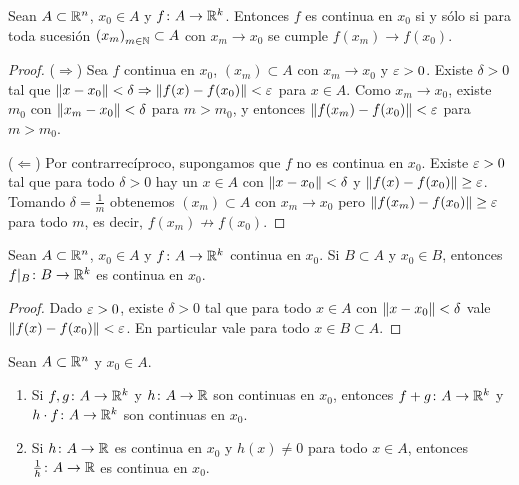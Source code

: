 \begin{prop}
  Sean \(A \subset \mathbb{R}^n\), \(x_0 \in A\) y \(f\colon A \to \mathbb{R}^k\). Entonces \(f\) es continua en \(x_0\) si y sólo si para toda sucesión \({(x_m)}_{m \in \mathbb{N}} \subset A\) con \(x_m \to x_0\) se cumple \(f(x_m) \to f(x_0)\).
\end{prop}

\begin{proof}
  (\(\Rightarrow\)) Sea \(f\) continua en \(x_0\), \({(x_m)} \subset A\) con \(x_m \to x_0\) y \(\varepsilon > 0\). Existe \(\delta > 0\) tal que \(\left\lVert x - x_0 \right\rVert < \delta \Rightarrow \left\lVert f(x) - f(x_0) \right\rVert < \varepsilon\) para \(x \in A\). Como \(x_m \to x_0\), existe \(m_0\) con \(\left\lVert x_m - x_0 \right\rVert < \delta\) para \(m > m_0\), y entonces \(\left\lVert f(x_m) - f(x_0) \right\rVert < \varepsilon\) para \(m > m_0\).

  (\(\Leftarrow\)) Por contrarrecíproco, supongamos que \(f\) no es continua en \(x_0\). Existe \(\varepsilon > 0\) tal que para todo \(\delta > 0\) hay un \(x \in A\) con \(\left\lVert x - x_0 \right\rVert < \delta\) y \(\left\lVert f(x) - f(x_0) \right\rVert \geq \varepsilon\). Tomando \(\delta = \frac{1}{m}\) obtenemos \({(x_m)} \subset A\) con \(x_m \to x_0\) pero \(\left\lVert f(x_m) - f(x_0) \right\rVert \geq \varepsilon\) para todo \(m\), es decir, \(f(x_m) \not\to f(x_0)\).
\end{proof}

\begin{prop}
  Sean \(A \subset \mathbb{R}^n\), \(x_0 \in A\) y \(f\colon A \to \mathbb{R}^k\) continua en \(x_0\). Si \(B \subset A\) y \(x_0 \in B\), entonces \(f|_B\colon B \to \mathbb{R}^k\) es continua en \(x_0\).
\end{prop}

\begin{proof}
  Dado \(\varepsilon > 0\), existe \(\delta > 0\) tal que para todo \(x \in A\) con \(\left\lVert x - x_0 \right\rVert < \delta\) vale \(\left\lVert f(x) - f(x_0) \right\rVert < \varepsilon\). En particular vale para todo \(x \in B \subset A\).
\end{proof}

\begin{prop}
  Sean \(A \subset \mathbb{R}^n\) y \(x_0 \in A\).
  \begin{enumerate}[label=(\arabic*)]
    \item Si \(f, g\colon A \to \mathbb{R}^k\) y \(h\colon A \to \mathbb{R}\) son continuas en \(x_0\), entonces \(f + g\colon A \to \mathbb{R}^k\) y \(h \cdot f\colon A \to \mathbb{R}^k\) son continuas en \(x_0\).
    \item Si \(h\colon A \to \mathbb{R}\) es continua en \(x_0\) y \(h(x) \neq 0\) para todo \(x \in A\), entonces \(\frac{1}{h}\colon A \to \mathbb{R}\) es continua en \(x_0\).
  \end{enumerate}
\end{prop}

